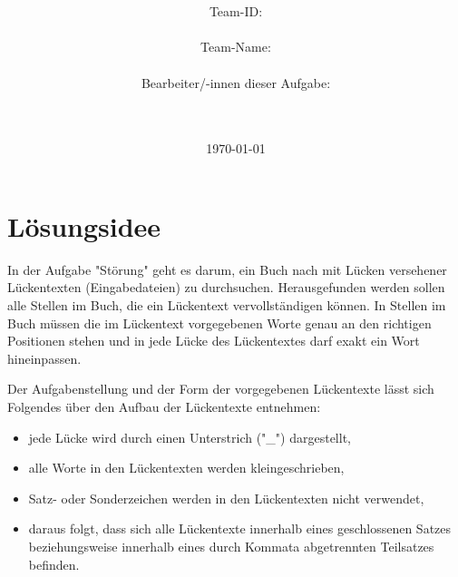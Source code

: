 \documentclass[a4paper,10pt,ngerman]{scrartcl}
\title{\textbf{\Huge\Aufgabe}}
\author{\LARGE Team-ID: \LARGE \TeamId \\\\
\LARGE Team-Name: \LARGE \TeamName \\\\
\LARGE Bearbeiter/-innen dieser Aufgabe: \\
\LARGE \Namen\\\\}
\date{\LARGE\today}
\begin{document}
	\maketitle
	\tableofcontents

    \vspace{0.5cm}

	\section{Lösungsidee}\label{sec:losungsidee}
    	In der Aufgabe "Störung" geht es darum, ein Buch nach mit Lücken versehener Lückentexten (Eingabedateien) zu durchsuchen.
		Herausgefunden werden sollen alle Stellen im Buch, die ein Lückentext vervollständigen können.
		In Stellen im Buch müssen die im Lückentext vorgegebenen Worte genau an den richtigen Positionen stehen und in jede Lücke des Lückentextes darf exakt ein Wort hineinpassen.

		Der Aufgabenstellung und der Form der vorgegebenen Lückentexte lässt sich Folgendes über den Aufbau der Lückentexte entnehmen:
		\begin{itemize}
			\item jede Lücke wird durch einen Unterstrich ("\_") dargestellt,
			\item alle Worte in den Lückentexten werden kleingeschrieben,
			\item Satz- oder Sonderzeichen werden in den Lückentexten nicht verwendet,
			\item daraus folgt, dass sich alle Lückentexte innerhalb eines geschlossenen Satzes beziehungsweise innerhalb eines durch Kommata abgetrennten Teilsatzes befinden.
		\end{itemize}
\end{document}

